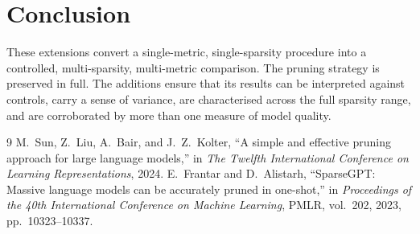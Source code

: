 \documentclass[11pt]{article}
\begin{document}
\section{Conclusion}

These extensions convert a single-metric, single-sparsity procedure into a controlled, multi-sparsity,
multi-metric comparison. The pruning strategy is preserved in full. The additions ensure that its results
can be interpreted against controls, carry a sense of variance, are characterised across the full sparsity
range, and are corroborated by more than one measure of model quality.

\begin{thebibliography}{9}
 M.~Sun, Z.~Liu, A.~Bair, and J.~Z.~Kolter, ``A simple and effective pruning approach for
large language models,'' in \emph{The Twelfth International Conference on Learning Representations}, 2024.
 E.~Frantar and D.~Alistarh, ``SparseGPT: Massive language models can be accurately
pruned in one-shot,'' in \emph{Proceedings of the 40th International Conference on Machine Learning},
PMLR, vol.~202, 2023, pp.~10323--10337.
\end{thebibliography}
\end{document}
